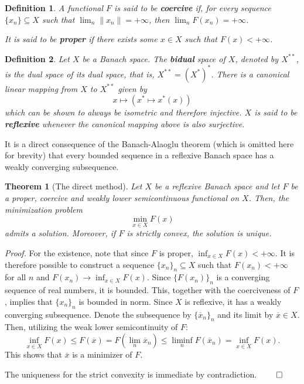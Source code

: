 \documentclass[twocolumn,twoside,a4paper,10pt]{IEEEtran}
\newtheorem{definition}{Definition}
\newtheorem{theorem}{Theorem}
\begin{document}
\begin{definition}
  A functional \(F\) is said to be \textbf{coercive} if, for every sequence \(\{x_n\}\subseteq X\) such that \(\lim_n \|x_n\|=+\infty\), then \(\lim_nF(x_n)=+\infty\).

  It is said to be \textbf{proper} if there exists some \(x\in X\) such that \(F(x) < +\infty\).
\end{definition}

\begin{definition}
  Let \(X\) be a Banach space. The \textbf{bidual} space of \(X\), denoted by \(X^{**}\), is the dual space of its dual space, that is, \(X^{**}=(X^*)^*\). There is a canonical linear mapping from \(X\) to \(X^{**}\) given by
  \[
    x\mapsto(x^*\mapsto x^*(x))
  \]
  which can be shown to always be isometric and therefore injective. \(X\) is said to be \textbf{reflexive} whenever the canonical mapping above is also surjective.
\end{definition}

It is a direct consequence of the Banach-Alaoglu theorem (which is omitted here for brevity) that every bounded sequence in a reflexive Banach space has a weakly converging subsequence.

\begin{theorem}[The direct method]\label{thm:direct-method}
  Let \(X\) be a reflexive Banach space and let \(F\) be a proper, coercive and weakly lower semicontinuous functional on \(X\). Then, the minimization problem
  \[
    \min_{x\in X} F(x)
  \]
  admits a solution. Moreover, if \(F\) is strictly convex, the solution is unique.
\end{theorem}
\textit{Proof.} For the existence, note that since \(F\) is proper, \(\inf_{x\in X} F(x)<+\infty\). It is therefore possible to construct a sequence \(\{x_n\}_n\subseteq X\) such that \(F(x_n)<+\infty\) for all \(n\) and \(F(x_n)\to \inf_{x\in X}F(x)\). Since \(\{F(x_n)\}_n\) is a converging sequence of real numbers, it is bounded. This, together with the coerciveness of \(F\), implies that \(\{x_n\}_n\) is bounded in norm. Since \(X\) is reflexive, it has a weakly converging subsequence. Denote the subsequence by \(\{\overline{x}_n\}_n\) and its limit by \(\overline{x}\in X\). Then, utilizing the weak lower semicontinuity of \(F\):
\[
  \inf_{x\in X}F(x) \leq F(\overline{x})=F(\lim_n \overline{x}_n)\leq\liminf_nF(\overline{x}_n)=\inf_{x\in X}F(x)
.\]
This shows that \(\overline{x}\) is a minimizer of \(F\).

The uniqueness for the strict convexity is immediate by contradiction. \(\qed\)
\end{document}
